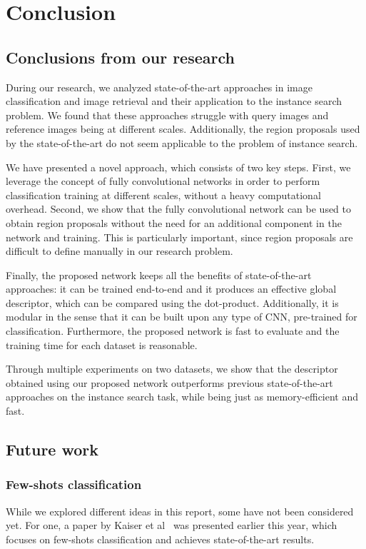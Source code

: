 
\chapter{Conclusion}
\section{Conclusions from our research}
During our research, we analyzed state-of-the-art approaches in
image classification and image retrieval and their application to
the instance search problem. We found that these approaches struggle
with query images and reference images being at different scales.
Additionally, the region proposals used by the state-of-the-art do not
seem applicable to the problem of instance search.

We have presented a novel approach, which consists of two key steps.
First, we leverage the concept of fully convolutional networks in order
to perform classification training at different scales, without a heavy
computational overhead. Second, we show that the fully convolutional
network can be used to obtain region proposals without the need for
an additional component in the network and training. This is particularly
important, since region proposals are difficult to define manually in
our research problem.

Finally, the proposed network keeps all the benefits of state-of-the-art
approaches: it can be trained end-to-end and it produces an effective
global descriptor, which can be compared using the dot-product.
Additionally, it is modular in the sense that it can be built upon
any type of CNN, pre-trained for classification.
Furthermore, the proposed network is fast to evaluate and the training
time for each dataset is reasonable.

Through multiple experiments on two datasets, we show that the descriptor
obtained using our proposed network outperforms previous state-of-the-art
approaches on the instance search task, while being just as memory-efficient
and fast.

\section{Future work}
\subsection{Few-shots classification}
While we explored different ideas in this report, some have not been
considered yet. For one, a paper by Kaiser et al~\cite{kaiser_learning_2017}
was presented earlier this year, which focuses on few-shots classification
and achieves state-of-the-art results.

